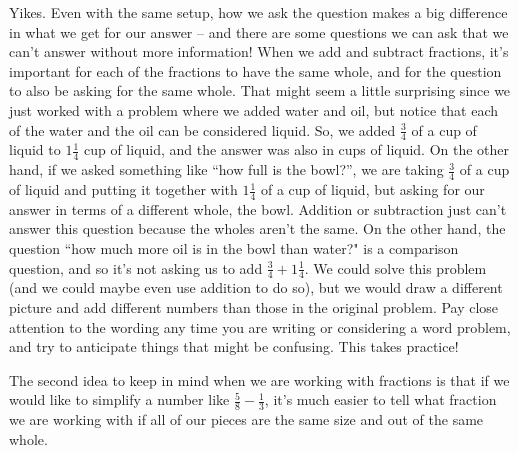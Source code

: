 \documentclass{ximera}
\begin{document}
Yikes. Even with the same setup, how we ask the question makes a big difference in what we get for our answer -- and there are some questions we can ask that we can't answer without more information! When we add and subtract fractions, it's important for each of the fractions to have the same whole, and for the question to also be asking for the same whole. That might seem a little surprising since we just worked with a problem where we added water and oil, but notice that each of the water and the oil can be considered liquid. So, we added $\frac{3}{4}$ of a cup of liquid to $1 \frac{1}{4}$ cup of liquid, and the answer was also in cups of liquid. On the other hand, if we asked something like ``how full is the bowl?'', we are taking $\frac{3}{4}$ of a cup of liquid and putting it together with $1 \frac{1}{4}$ of a cup of liquid, but asking for our answer in terms of a different whole, the bowl. Addition or subtraction just can't answer this question because the wholes aren't the same. On the other hand, the question ``how much more oil is in the bowl than water?" is a comparison question, and so it's not asking us to add $\frac{3}{4} + 1 \frac{1}{4}$. We could solve this problem (and we could maybe even use addition to do so), but we would draw a different picture and add different numbers than those in the original problem. Pay close attention to the wording any time you are writing or considering a word problem, and try to anticipate things that might be confusing. This takes practice!

The second idea to keep in mind when we are working with fractions is that if we would like to simplify a number like $\frac{5}{8} - \frac{1}{3}$, it's much easier to tell what fraction we are working with if all of our pieces are the same size and out of the same whole. 
\end{document}
